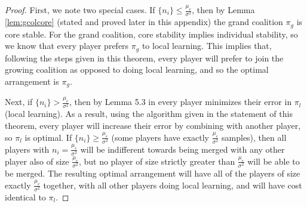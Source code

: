 \documentclass{article}
\newcommand{\mue}[0]{\ensuremath{\mu_e}}
\newcommand{\var}[0]{\ensuremath{\sigma^2}}
\newcommand{\ndraw}[0]{\ensuremath{n}}
\newcommand{\alone}[0]{\ensuremath{\pi_l}}
\newcommand{\gcol}[0]{\ensuremath{\pi_g}}
\begin{document}
\begin{proof}
First, we note two special cases. If $\{\ndraw_i\}\leq \frac{\mue}{\var}$, then by Lemma \ref{lem:gcolcore} (stated and proved later in this appendix) the grand coalition $\gcol$ is core stable. For the grand coalition, core stability implies individual stability, so we know that every player prefers $\gcol$ to local learning. This implies that, following the steps given in this theorem, every player will prefer to join the growing coalition as opposed to doing local learning, and so the optimal arrangement is $\gcol$. 

Next, if $\{\ndraw_i\}> \frac{\mue}{\var}$, then by Lemma 5.3 in \cite{donahue2020model} every player minimizes their error in $\alone$ (local learning). As a result, using the algorithm given in the statement of this theorem, every player will increase their error by combining with another player, so $\alone$ is optimal. If $\{\ndraw_i\}\geq \frac{\mue}{\var}$ (some players have exactly $\frac{\mue}{\var}$ samples), then all players with $\ndraw_i = \frac{\mue}{\var}$ will be indifferent towards being merged with any other player also of size $\frac{\mue}{\var}$, but no player of size strictly greater than $\frac{\mue}{\var}$ will be able to be merged. The resulting optimal arrangement will have all of the players of size exactly  $\frac{\mue}{\var}$ together, with all other players doing local learning, and will have cost identical to $\alone$. 


\end{proof}
\end{document}

